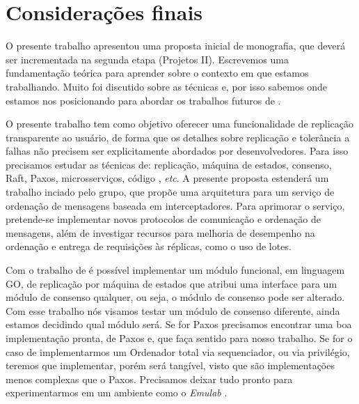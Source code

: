 \chapter{Considerações finais}


O presente trabalho apresentou uma proposta inicial de monografia, que deverá ser incrementada na segunda etapa (Projetos II). Escrevemos uma fundamentação teórica para aprender sobre o contexto em que estamos trabalhando. Muito foi discutido sobre as técnicas e, por isso sabemos onde estamos nos posicionando para abordar os trabalhos futuros de \textcite{renan2021hermes}.


O presente trabalho tem como objetivo oferecer uma funcionalidade de replicação transparente ao usuário, de forma que os detalhes sobre replicação e tolerância a falhas não precisem ser explicitamente abordados por desenvolvedores. Para isso precisamos estudar as técnicas de: replicação, máquina de estados, consenso, Raft, Paxos, microsserviços, código \cite{renan2021hermes}, \textit{etc}. A presente proposta estenderá um trabalho inciado pelo grupo, que propõe uma arquitetura para um serviço de ordenação de mensagens baseada em interceptadores. Para aprimorar o serviço, pretende-se implementar novos protocolos de comunicação e ordenação de mensagens, além de investigar recursos para melhoria de desempenho na ordenação e entrega de requisições às réplicas, como o uso de lotes.


Com o trabalho de \textcite{renan2021hermes} é possível implementar um módulo funcional, em linguagem GO, de replicação por máquina de estados que atribui uma interface para um módulo de consenso qualquer, ou seja, o módulo de consenso pode ser alterado. Com esse trabalho nós visamos testar um módulo de consenso diferente, ainda estamos decidindo qual módulo será. Se for Paxos precisamos encontrar uma boa implementação pronta, de Paxos e, que faça sentido para nosso trabalho. Se for o caso de implementarmos um Ordenador total via sequenciador, ou via privilégio, teremos que implementar, porém será tangível, visto que são implementações menos complexas que o Paxos. Precisamos deixar tudo pronto para experimentarmos em um ambiente como o \textit{Emulab} \cite{emulab-10.1145/844128.844152}.




